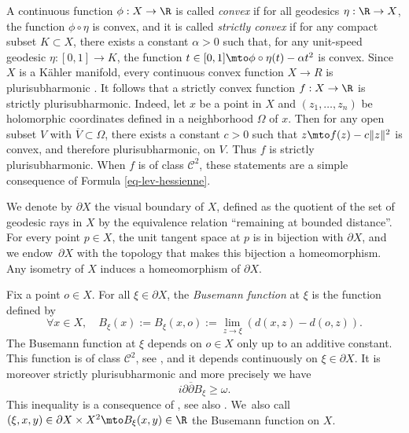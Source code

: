 A continuous function $\phi:X\to \R$ is called \textit{convex} if for all geodesics $\eta:\R\to X$, the function $\phi\circ\eta$ is convex, and it is called \textit{strictly convex} if for any compact subset \hbox{$K\!\subset\! X$}, there exists a constant $\alpha>0$ such that, for any unit-speed geodesic \hbox{$\eta:[0,1]\to K$}, the function $t\in [0,1]\mto \phi\circ\eta(t)-\alpha t^{2}$ is convex. Since $X$ is a Kähler manifold, every continuous convex function $X\to R$ is plurisubharmonic \cite[Th.\,3]{greeneSubharmonicityPlurisubharmonicityGeodesically1973}. It follows that a strictly convex function $f:X\to \R$ is strictly plurisubharmonic. Indeed, let $x$ be a point in $X$ and $(z_1,\dots,z_n)$ be holomorphic coordinates defined in a neighborhood $\Omega$ of $x$. Then for any open subset $V$ with $\overline{V}\subset \Omega$, there exists a constant $c>0$ such that $z\mto f(z)-c\lVert z\rVert^{2}$ is convex, and therefore plurisubharmonic, on $V$. Thus $f$ is strictly plurisubharmonic. When $f$ is of class $\mathcal{C}^2$, these statements are a simple consequence of Formula \eqref{eq-lev-hessienne}.

We denote by $\partial X$ the visual boundary of $X$, defined as the quotient of the set of geodesic rays in $X$ by the equivalence relation ``remaining at bounded distance''. For every point $p\in X$, the unit tangent space at $p$ is in bijection with $\partial X$, and we endow~$\partial X$ with the topology that makes this bijection a homeomorphism. Any isometry of $X$ induces a homeomorphism of $\partial X$.

Fix a point $o\in X$. For all $\xi \in \partial X$, the \textit{Busemann function} at $\xi$ is the function defined by
\begin{equation*}
\forall x\in X,\quad B_{\xi}(x):= B_{\xi}(x,o):= \lim_{z\to \xi}(d(x,z)-d(o,z)).
\end{equation*}
The Busemann function at $\xi$ depends on $o\in X$ only up to an additive constant. This function is of class $\mathcal{C}^{2}$, see \cite[Prop.\,3.1]{heintzeGeometryHorospheres1977}, and it depends continuously on $\xi \in \partial X$. It is moreover strictly plurisubharmonic and more precisely we have\begin{equation}\label{eq-Busemann-spsh}
i\partial\overline{\partial}B_{\xi} \ge \omega.
\end{equation}
This inequality is a consequence of \cite[Prop.\,2.28]{greeneFunctionTheoryManifolds1979}, see also \cite{siuCompactificationNegativelyCurved1982,chenDiscreteGroupsHolomorphic2013}. We~also call $(\xi,x,y)\in \partial X\times X^{2} \mto B_{\xi}(x,y) \in\R$ the Busemann function on $X$.

